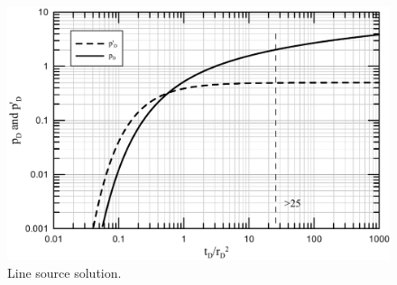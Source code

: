 \documentclass{llncs}
\numberwithin{equation}{section}
\numberwithin{figure}{section}
\numberwithin{table}{section}
\begin{document}
    \begin{figure}
        \begin{center}
        \includegraphics[scale=0.6]{pD_pD_der_Line_Source.pdf}
        \end{center}
        \caption{Line source solution.}
        \label{pD_pD_der_Line_Source}
    \end{figure}
\end{document}
